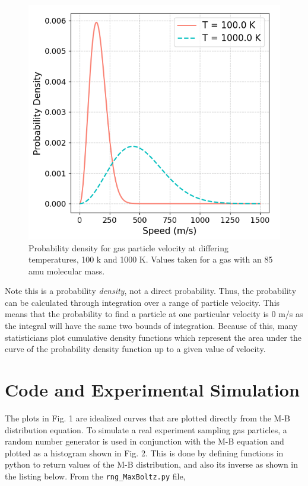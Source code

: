 \documentclass[%
 reprint,
 amsmath,amssymb,
 aps,
]{revtex4-2}
\begin{document}
\begin{figure}[h]
	\caption{Probability density for gas particle velocity at differing temperatures, 100 k and 1000 K. Values taken for a gas with an 85 amu molecular mass. }
	\centering
	\includegraphics[scale=0.51]{hypothesis1.png}
\end{figure}

Note this is a probability \textit{density}, not a direct probability. Thus, the probability can be calculated through integration over a range of particle velocity. This means that the probability to find a particle at one particular velocity is 0 m/s as the integral will have the same two bounds of integration. Because of this, many statisticians plot cumulative density functions which represent the area under the curve of the probability density function up to a given value of velocity.

\section{Code and Experimental Simulation}

The plots in Fig. 1 are idealized curves that are plotted directly from the M-B distribution equation. To simulate a real experiment sampling gas particles, a random number generator is used in conjunction with the M-B equation and plotted as a histogram shown in Fig. 2. This is done by defining functions in python to return values of the M-B distribution, and also its inverse as shown in the listing below. From the \lstinline{rng_MaxBoltz.py} file,
\end{document}
